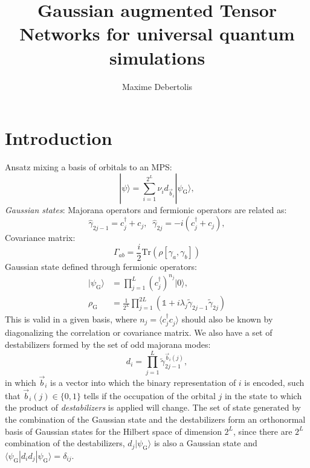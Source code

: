 \documentclass[a4paper, twocolumn, superscriptaddress, longbibliography]{revtex4-2}
\begin{document}
	\author{Maxime Debertolis}
	\title{Gaussian augmented Tensor Networks for universal quantum simulations}

	\begin{abstract}

	\end{abstract}

	\maketitle

	\section{Introduction}
	
	Ansatz mixing a basis of orbitals to an MPS:
	\begin{equation}
		|\psi \rangle = \sum_{i=1}^{2^{L}} \nu_i^{} d_{\vec{b}_i}^{} |\psi_{\mathrm{G}}^{}\rangle,
	\end{equation}
	\emph{Gaussian states}:
	Majorana operators and fermionic operators are related as:
	\begin{equation}
		\hat{\gamma}_{2j-1} = c^{\dagger}_{j} + c_{j}, \;\;
		\hat{\gamma}_{2j} = -i ( c^{\dagger}_{j} + c_{j}),
	\end{equation}
	Covariance matrix: 
	\begin{equation}
		\Gamma_{ab}^{} = \frac{i}{2} \mathrm{Tr}\left(\rho[\gamma_a^{},\gamma_b^{}] \right)
	\end{equation}
	Gaussian state defined through fermionic operators:
	\begin{equation}
		\begin{split}
			|\psi_{\mathrm{G}}\rangle &= \prod_{j=1}^{L}\left(c_{j}^{\dagger}\right)^{n_j}|0\rangle, \\
			\rho_{\mathrm{G}}^{} &= \frac{1}{2^{L}}\prod\limits_{j=1}^{2L}\left(\mathds{1} + i\lambda_{j} \tilde{\gamma}_{2j-1}^{} \tilde{\gamma}_{2j}^{} \right)
		\end{split}
	\end{equation}
	This is valid in a given basis, where $n_j=\langle c^{\dagger}_j c^{}_j\rangle$ should also be known by diagonalizing the correlation or covariance matrix. We also have a	set of destabilizers formed by the set of odd majorana modes:
	\begin{equation}
	d^{}_i = \prod_{j=1}^{L}\tilde{\gamma}_{2j-1}^{\vec{b}_{i}(j)},
	\end{equation}
	in which $\vec{b}_i$ is a vector into which the binary representation of $i$ is encoded, such that $\vec{b}_{i}(j) \in \{0,1\}$ tells if the occupation of the orbital $j$ in the state to which the product of \emph{destabilizers} is applied will change. The set of state generated by the combination of the Gaussian state and the destabilizers form an orthonormal basis of Gaussian states for the Hilbert space of dimension $2^{L}$, since there are $2^L$ combination of the destabilizers, $d_j |\psi_{\mathrm{G}}\rangle$ is also a Gaussian state and $\langle \psi_{\mathrm{G}}^{}|d_i d_j |\psi_{\mathrm{G}}\rangle = \delta_{ij}$.
	
\end{document}
